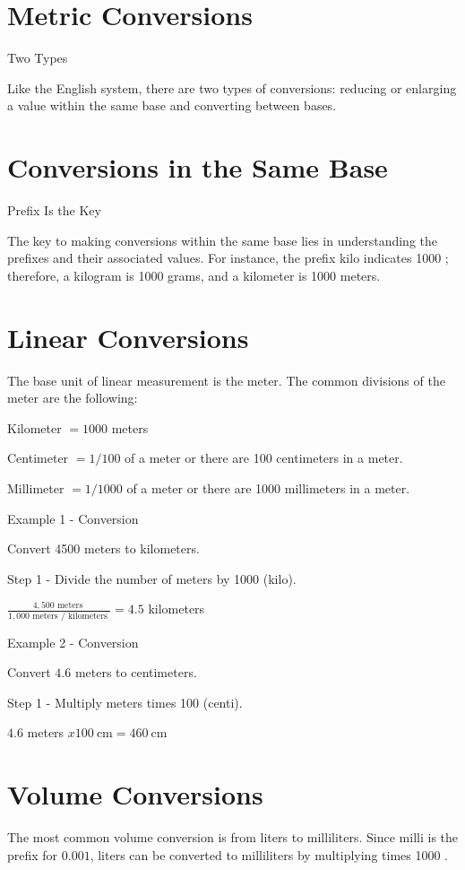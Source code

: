 \section{Metric Conversions}
Two Types

Like the English system, there are two types of conversions: reducing or enlarging a value within the same base and converting between bases.

\section{Conversions in the Same Base}
Prefix Is the Key

The key to making conversions within the same base lies in understanding the prefixes and their associated values. For instance, the prefix kilo indicates 1000 ; therefore, a kilogram is 1000 grams, and a kilometer is 1000 meters.

\section{Linear Conversions}
The base unit of linear measurement is the meter. The common divisions of the meter are the following:

Kilometer $=1000$ meters

Centimeter $=1 / 100$ of a meter or there are 100 centimeters in a meter.

Millimeter $=1 / 1000$ of a meter or there are 1000 millimeters in a meter.

Example 1 - Conversion

Convert 4500 meters to kilometers.

Step 1 - Divide the number of meters by 1000 (kilo).

$\frac{4,500 \text { meters }}{1,000 \text { meters } / \text { kilometers }}=4.5$ kilometers

Example 2 - Conversion

Convert $4.6$ meters to centimeters.

Step 1 - Multiply meters times 100 (centi).

$4.6$ meters $x 100 \mathrm{~cm}=460 \mathrm{~cm}$

\section{Volume Conversions}
The most common volume conversion is from liters to milliliters. Since milli is the prefix for $0.001$, liters can be converted to milliliters by multiplying times 1000 .

